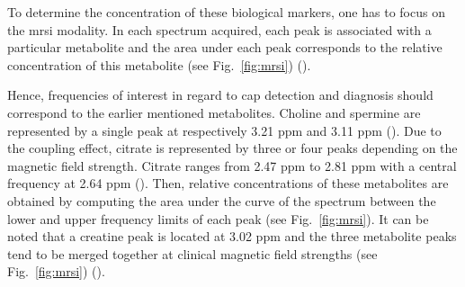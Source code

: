 \begin{enumerate}[leftmargin=*]

To determine the concentration of these biological markers, one has to focus on the \ac{mrsi} modality. %
In each spectrum acquired, each peak is associated with a particular metabolite and the area under each peak corresponds to the relative concentration of this metabolite (see Fig.~\ref{fig:mrsi}) (\cite{Parfait2010}).

Hence, frequencies of interest in regard to \ac{cap} detection and diagnosis should correspond to the earlier mentioned metabolites. Choline and spermine are represented by a single peak at respectively 3.21 ppm and 3.11 ppm (\cite{Verma2010}). Due to the coupling effect, citrate is represented by three or four peaks depending on the magnetic field strength. Citrate ranges from 2.47 ppm to 2.81 ppm with a central frequency at 2.64 ppm (\cite{Verma2010}). Then, relative concentrations of these metabolites are obtained by computing the area under the curve of the spectrum between the lower and upper frequency limits of each peak (see Fig.~\ref{fig:mrsi}). It can be noted that a creatine peak is located at 3.02 ppm and the three metabolite peaks tend to be merged together at clinical magnetic field strengths (see Fig.~\ref{fig:mrsi}) (\cite{Hoeks2011,Graaf2000}).



\end{enumerate}
